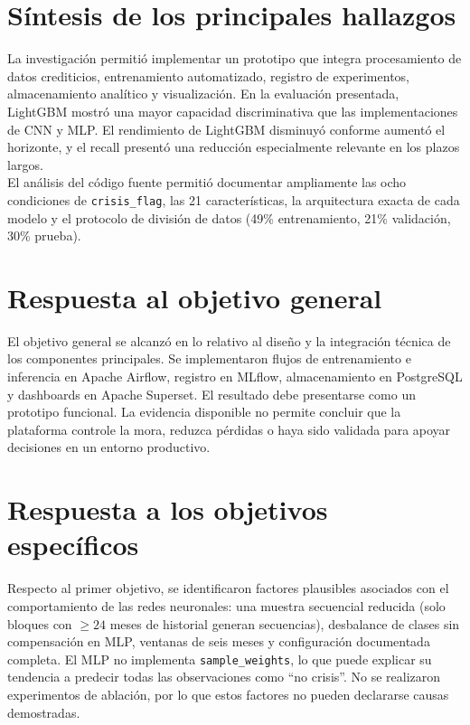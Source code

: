 \section{Síntesis de los principales hallazgos}

La investigación permitió implementar un prototipo que integra procesamiento de datos crediticios, entrenamiento automatizado, registro de experimentos, almacenamiento analítico y visualización. En la evaluación presentada, LightGBM mostró una mayor capacidad discriminativa que las implementaciones de CNN y MLP. El rendimiento de LightGBM disminuyó conforme aumentó el horizonte, y el recall presentó una reducción especialmente relevante en los plazos largos.\\

El análisis del código fuente permitió documentar ampliamente las ocho condiciones de \texttt{crisis\_flag}, las 21 características, la arquitectura exacta de cada modelo y el protocolo de división de datos (49\% entrenamiento, 21\% validación, 30\% prueba).

\section{Respuesta al objetivo general}

El objetivo general se alcanzó en lo relativo al diseño y la integración técnica de los componentes principales. Se implementaron flujos de entrenamiento e inferencia en Apache Airflow, registro en MLflow, almacenamiento en PostgreSQL y dashboards en Apache Superset. El resultado debe presentarse como un prototipo funcional. La evidencia disponible no permite concluir que la plataforma controle la mora, reduzca pérdidas o haya sido validada para apoyar decisiones en un entorno productivo.

\section{Respuesta a los objetivos específicos}

Respecto al primer objetivo, se identificaron factores plausibles asociados con el comportamiento de las redes neuronales: una muestra secuencial reducida (solo bloques con $\geq 24$ meses de historial generan secuencias), desbalance de clases sin compensación en MLP, ventanas de seis meses y configuración documentada completa. El MLP no implementa \texttt{sample\_weights}, lo que puede explicar su tendencia a predecir todas las observaciones como ``no crisis''. No se realizaron experimentos de ablación, por lo que estos factores no pueden declararse causas demostradas.\\

